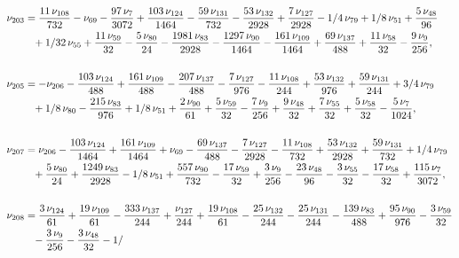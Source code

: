 \documentclass[a4paper,12pt, DIV=14, BCOR=5mm, twoside, headsepline, numbers=noenddot]{scrbook}
\begin{document}
\begin{align}\label{AreaSol19}
\begin{aligned}
\nu_{{203}}&={\frac {11\,\nu_{{108}}}{732
}}-\nu_{{69}}-{\frac {97\,\nu_{{7}}}{3072}}+{\frac {103\,\nu_{{124}}}{
1464}}-{\frac {59\,\nu_{{131}}}{732}}-{\frac {53\,\nu_{{132}}}{2928}}+
{\frac {7\,\nu_{{127}}}{2928}}-1/4\,\nu_{{79}}+1/8\,\nu_{{51}}+{\frac 
{5\,\nu_{{48}}}{96}}\\
 &\hphantom{=}+1/32\,\nu_{{55}}+{\frac {11\,\nu_{{59}}}{32}}-{
\frac {5\,\nu_{{80}}}{24}}-{\frac {1981\,\nu_{{83}}}{2928}}-{\frac {
1297\,\nu_{{90}}}{1464}}-{\frac {161\,\nu_{{109}}}{1464}}+{\frac {69\,
\nu_{{137}}}{488}}+{\frac {11\,\nu_{{58}}}{32}}-{\frac {9\,\nu_{{9}}}{
256}}, \\
\\
\nu_{{205}}&=-\nu_{{206}}-{\frac {103\,\nu_{{124}}}{488}}+{\frac 
{161\,\nu_{{109}}}{488}}-{\frac {207\,\nu_{{137}}}{488}}-{\frac {7\,
\nu_{{127}}}{976}}-{\frac {11\,\nu_{{108}}}{244}}+{\frac {53\,\nu_{{
132}}}{976}}+{\frac {59\,\nu_{{131}}}{244}}+3/4\,\nu_{{79}}\\
 &\hphantom{=}+1/8\,\nu_{
{80}}-{\frac {215\,\nu_{{83}}}{976}}+1/8\,\nu_{{51}}+{\frac {2\,\nu_{{
90}}}{61}}+{\frac {5\,\nu_{{59}}}{32}}-{\frac {7\,\nu_{{9}}}{256}}+{
\frac {9\,\nu_{{48}}}{32}}+{\frac {7\,\nu_{{55}}}{32}}+{\frac {5\,\nu_
{{58}}}{32}}-{\frac {5\,\nu_{{7}}}{1024}}, \\
\\
\nu_{{207}}&=\nu_{{206}}-{
\frac {103\,\nu_{{124}}}{1464}}+{\frac {161\,\nu_{{109}}}{1464}}+\nu_{
{69}}-{\frac {69\,\nu_{{137}}}{488}}-{\frac {7\,\nu_{{127}}}{2928}}-{
\frac {11\,\nu_{{108}}}{732}}+{\frac {53\,\nu_{{132}}}{2928}}+{\frac {
59\,\nu_{{131}}}{732}}+1/4\,\nu_{{79}}\\
 &\hphantom{=}+{\frac {5\,\nu_{{80}}}{24}}+{
\frac {1249\,\nu_{{83}}}{2928}}-1/8\,\nu_{{51}}+{\frac {557\,\nu_{{90}
}}{732}}-{\frac {17\,\nu_{{59}}}{32}}+{\frac {3\,\nu_{{9}}}{256}}-{
\frac {23\,\nu_{{48}}}{96}}-{\frac {3\,\nu_{{55}}}{32}}-{\frac {17\,
\nu_{{58}}}{32}}+{\frac {115\,\nu_{{7}}}{3072}}, \\
\\
\nu_{{208}}&={\frac {3
\,\nu_{{124}}}{61}}+{\frac {19\,\nu_{{109}}}{61}}-{\frac {333\,\nu_{{
137}}}{244}}+{\frac {\nu_{{127}}}{244}}+{\frac {19\,\nu_{{108}}}{61}}-
{\frac {25\,\nu_{{132}}}{244}}-{\frac {25\,\nu_{{131}}}{244}}-{\frac {
139\,\nu_{{83}}}{488}}+{\frac {95\,\nu_{{90}}}{976}}-{\frac {3\,\nu_{{
59}}}{32}}\\
 &\hphantom{=}-{\frac {3\,\nu_{{9}}}{256}}-{\frac {3\,\nu_{{48}}}{32}}-1/

\end{aligned}
\end{align}
\end{document}
